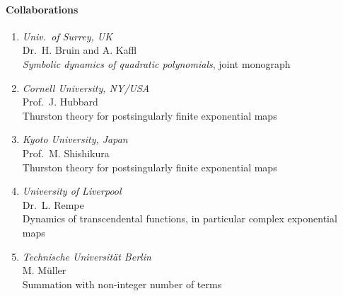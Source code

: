 \paragraph{Collaborations}
\begin{enumerate}
\item {\sl Univ.\ of Surrey, UK} \\
  Dr.~H. Bruin and A. Kaffl \\
  {\em Symbolic dynamics of quadratic polynomials}, joint monograph
\item {\sl Cornell University, NY/USA} \\
  Prof.~J. Hubbard \\
  Thurston theory for postsingularly finite exponential maps
\item {\sl Kyoto University, Japan} \\
  Prof.~M. Shishikura \\
  Thurston theory for postsingularly finite exponential maps
\item {\sl University of Liverpool} \\
  Dr.~L. Rempe \\
  Dynamics of transcendental functions, in particular complex exponential maps
\item {\sl Technische Universit\"at Berlin} \\
  M. M\"uller \\
  Summation with non-integer number of terms
\end{enumerate}


